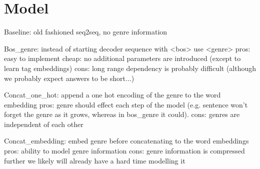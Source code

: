 \section{Model}


Baseline:
    old fashioned seq2seq, no genre information

Bos_genre:
    instead of starting decoder sequence with <bos> use <genre>
    pros:
        easy to implement
        cheap: no additional parameters are introduced
            (except to learn tag embeddings)
    cons:
        long range dependency is probably difficult
            (although we probably expect answers to be short...)

Concat_one_hot:
    append a one hot encoding of the genre to the word embedding
    pros:
        genre should effect each step of the model
        (e.g. sentence won't forget the genre as it grows,
            whereas in bos_genre it could).
    cons:
        genres are independent of each other

Concat_embedding:
    embed genre before concatenating to the word embeddings
    pros:
        ability to model genre information
    cons:
        genre information is compressed further
        we likely will already have a hard time modelling it